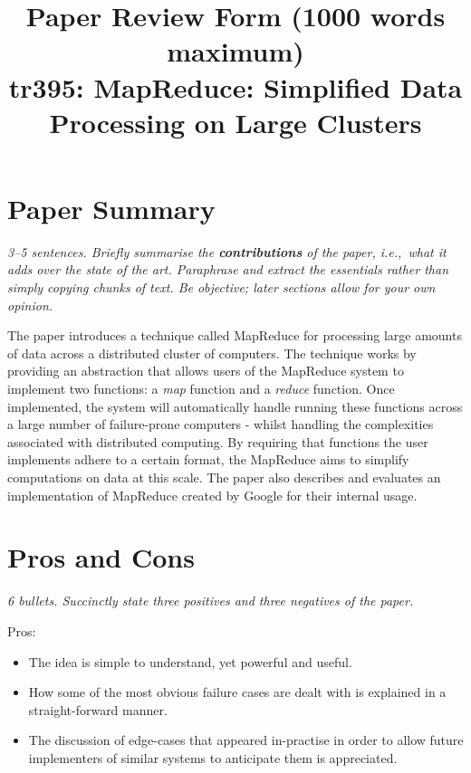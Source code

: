 \documentclass[11pt]{article}
\begin{document}

\title{Paper Review Form (1000 words maximum)\\
    tr395: MapReduce: Simplified Data Processing on Large Clusters \cite{MapReduce}}

\maketitle

\section*{Paper Summary}

\textsl{3--5 sentences. Briefly summarise the {\bf contributions} of the paper,
i.e.,~what it adds over the state of the art. Paraphrase and extract the
essentials rather than simply copying chunks of text. Be objective; later
sections allow for your own opinion.}

The paper introduces a technique called MapReduce for processing large amounts
of data across a distributed cluster of computers. The technique works by
providing an abstraction that allows users of the MapReduce system to implement
two functions: a \textit{map} function and a \textit{reduce} function. Once
implemented, the system will automatically handle running these functions
across a large number of failure-prone computers - whilst handling the
complexities associated with distributed computing. By requiring that functions
the user implements adhere to a certain format, the MapReduce aims to simplify
computations on data at this scale. The paper also describes and evaluates an
implementation of MapReduce created by Google for their internal usage.


\section*{Pros and Cons}

\textsl{6 bullets. Succinctly state three positives and three negatives of the
paper.}

Pros:

\begin{itemize}

    \item The idea is simple to understand, yet powerful and useful.

    \item How some of the most obvious failure cases are dealt with is
    explained in a straight-forward manner.

    \item The discussion of edge-cases that appeared in-practise in order to
    allow future implementers of similar systems to anticipate them is
    appreciated.

\end{itemize}
\end{document}
